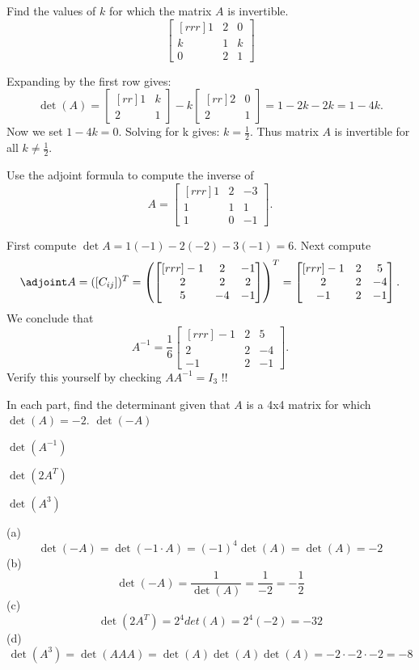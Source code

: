 \ii Find the values of $k$ for which the matrix $A$ is invertible.\\
$$
\begin{bmatrix}[rrr]
1&2&0\\
k&1&k\\
0&2&1
\end{bmatrix}
$$
\begin{solution}Expanding by the first row gives:\\
$$
\det(A) = 
\begin{bmatrix}[rr]
1&k\\
2&1
\end{bmatrix}
-k
\begin{bmatrix}[rr]
2&0\\
2&1
\end{bmatrix}
=1-2k-2k = 1-4k.
$$
Now we set $1-4k = 0$. Solving for k gives: $k = \frac{1}{2}$. Thus matrix $A$ is invertible for all $k\neq \frac{1}{2}$.
\end{solution}
\ii Use the adjoint formula to compute the inverse of 
\[
A=\begin{bmatrix}[rrr]
1&2&-3\\
1&1&1\\
1&0&-1
\end{bmatrix}.
\]
\begin{solution}
\noindent
First compute $\det A=1(-1)-2(-2)-3(-1)=6$. Next compute 
\[
\adjoint A=([C_{ij}])^T=\left( \begin{bmatrix}[rrr]
-1&2&-1\\
2&2&2\\
5&-4&-1
\end{bmatrix}
\right)^T
=\begin{bmatrix}[rrr]
-1&2&5\\
2&2&-4\\
-1&2&-1
\end{bmatrix}.
\]
We conclude that 
\[
A^{-1}=\frac{1}{6}\begin{bmatrix}[rrr]
-1&2&5\\
2&2&-4\\
-1&2&-1
\end{bmatrix}.
\]
Verify this yourself by checking $AA^{-1}=I_3$ !!
\end{solution}
\ii In each part, find the determinant given that $A$ is a 4x4 matrix for which $\det(A) = -2$.
\bb
\ii  $\det(-A)$ 

\ii $\det(A^{-1})$

\ii $\det(2A^T)$

\ii $\det(A^3)$
\ee
\begin{solution}
\noindent
(a) 
$$\det(-A)=\det(-1 \cdot A) = (-1)^4\det(A) = \det(A) = -2$$
(b)
$$\det(-A) = \frac{1}{\det(A)} = \frac{1}{-2} = -\frac{1}{2} $$
(c)
$$\det(2A^T)=2^4det(A)=2^4(-2)=-32 $$
(d)
$$ \det(A^3)=\det(AAA)=\det(A)\det(A)\det(A)=-2\cdot -2\cdot -2=-8$$
\end{solution}

